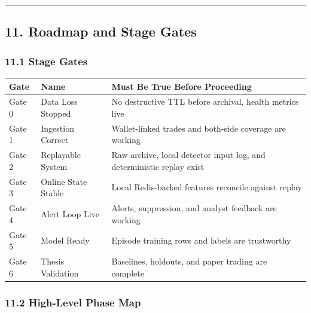 \documentclass[
]{article}
\newcounter{none} %
\begin{document}
\begin{center}\rule{0.5\linewidth}{0.5pt}\end{center}

\subsection{11. Roadmap and Stage
Gates}\label{11-roadmap-and-stage-gates}

\subsubsection{11.1 Stage Gates}\label{111-stage-gates}

{\def\LTcaptype{none} %
\begin{longtable}[]{@{}lll@{}}
\toprule\noalign{}
Gate & Name & Must Be True Before Proceeding \\
\midrule\noalign{}
\endhead
\bottomrule\noalign{}
\endlastfoot
Gate 0 & Data Loss Stopped & No destructive TTL before archival, health
metrics live \\
Gate 1 & Ingestion Correct & Wallet-linked trades and both-side coverage
are working \\
Gate 2 & Replayable System & Raw archive, local detector input log, and
deterministic replay exist \\
Gate 3 & Online State Stable & Local Redis-backed features reconcile
against
replay \\
Gate 4 & Alert Loop Live & Alerts, suppression, and analyst feedback are
working \\
Gate 5 & Model Ready & Episode training rows and labels are
trustworthy \\
Gate 6 & Thesis Validation & Baselines, holdouts, and paper trading are
complete \\
\end{longtable}
}

\subsubsection{11.2 High-Level Phase
Map}\label{112-high-level-phase-map}
\end{document}
